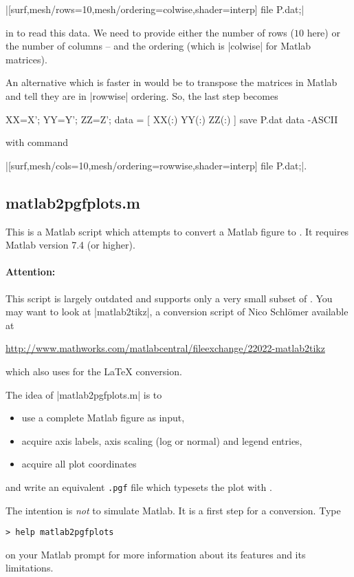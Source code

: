 {\begin{pgfgraphicnamed}
|[surf,mesh/rows=10,mesh/ordering=colwise,shader=interp] file {P.dat};|

in \PGFPlots{} to read this data. We need to provide either the number of rows
($10$ here) or the number of columns -- and the ordering (which is |colwise|
for Matlab matrices).

An alternative which is faster in \PGFPlots{} would be to transpose the
matrices in Matlab and tell \PGFPlots{} they are in |rowwise| ordering. So, the
last step becomes
%
\begin{codeexample}
XX=X'; YY=Y'; ZZ=Z';
data = [ XX(:) YY(:) ZZ(:) ]
save P.dat data -ASCII
\end{codeexample}
%
\noindent with \PGFPlots{} command

|[surf,mesh/cols=10,mesh/ordering=rowwise,shader=interp] file {P.dat};|.


\subsection{matlab2pgfplots.m}

This is a Matlab\textregistered{} script which attempts to convert a
Matlab figure to \PGFPlots{}. It requires Matlab version 7.4 (or higher).


\paragraph{Attention:}

This script is largely outdated and supports only a very small subset of
\PGFPlots{}. You may want to look at |matlab2tikz|, a conversion script of Nico
Schlömer available at

\url{http://www.mathworks.com/matlabcentral/fileexchange/22022-matlab2tikz}

\noindent which also uses \PGFPlots{} for the \LaTeX{} conversion.

\medskip
The idea of |matlab2pgfplots.m| is to
%
\begin{itemize}
    \item use a complete Matlab figure as input,
    \item acquire axis labels, axis scaling (log or normal) and legend
        entries,
    \item acquire all plot coordinates
\end{itemize}
%
and write an equivalent \texttt{.pgf} file which typesets the plot with
\PGFPlots{}.

The intention is \emph{not} to simulate Matlab. It is a first step for a
conversion. Type
%
\begin{lstlisting}
> help matlab2pgfplots
\end{lstlisting}
%
on your Matlab prompt for more information about its features and its
limitations.


\end{pgfgraphicnamed}}
